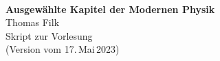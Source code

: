 \documentclass[german,10pt]{book}
\begin{document}
\mbox{~}
\vspace{3cm}

\begin{center}
{\bf\LARGE Ausgew\"ahlte Kapitel der Modernen Physik}\\[0.5cm] 
{\large Thomas Filk}\\[1.5cm]
Skript zur Vorlesung\\[2cm]
(Version vom 17.\,Mai\,2023)
\end{center}
\thispagestyle{empty}


\newpage



\tableofcontents













%
%
%

%
\newpage

\printindex
\end{document}
